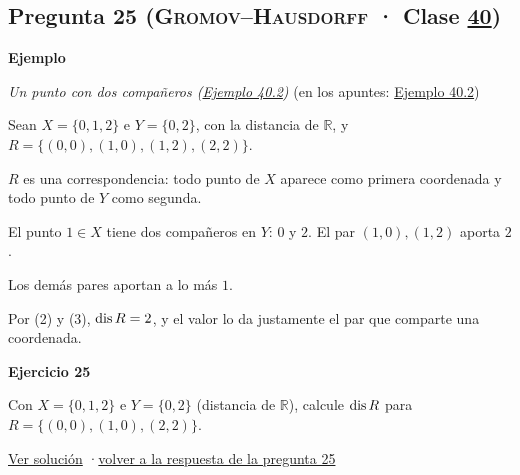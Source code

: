 \documentclass[11pt,a4paper]{article}
\newcommand{\R}{\mathbb{R}}\newcommand{\N}{\mathbb{N}}\newcommand{\Q}{\mathbb{Q}}
\newcommand{\bloque}[1]{\par\smallskip\noindent\textbf{\color{acento}#1}\par}
\begin{document}
\subsection*{\hypertarget{e-25}{}Pregunta 25 \normalfont\small(\textsc{Gromov–Hausdorff} · Clase \href{https://decostruttivismo.github.io/MAT2514-repaso/pdf/MAT2514_apuntes_completos.pdf\#nameddest=section.40}{40})}
\bloque{Ejemplo}
\textit{Un punto con dos compañeros (\href{https://decostruttivismo.github.io/MAT2514-repaso/pdf/MAT2514_apuntes_completos.pdf\#nameddest=teorema.40.2}{Ejemplo 40.2})} {\small(en los apuntes: \href{https://decostruttivismo.github.io/MAT2514-repaso/pdf/MAT2514_apuntes_completos.pdf\#nameddest=teorema.40.2}{Ejemplo 40.2})}
\begin{pasos}
\item[] Sean $X=\{0,1,2\}$ e $Y=\{0,2\}$, con la distancia de $\R$, y $R=\{(0,0),(1,0),(1,2),(2,2)\}$.
\item[(1)] $R$ es una correspondencia: todo punto de $X$ aparece como primera coordenada y todo punto de $Y$ como segunda.
\item[(2)] El punto $1\in X$ tiene dos compañeros en $Y$: $0$ y $2$. El par $(1,0),(1,2)$ aporta $2$.
\item[(3)] Los demás pares aportan a lo más $1$.
\item[] Por (2) y (3), $\operatorname{dis} R=2$, y el valor lo da justamente el par que comparte una coordenada.
\end{pasos}
\bloque{\hypertarget{x-25}{}Ejercicio 25}
Con $X=\{0,1,2\}$ e $Y=\{0,2\}$ (distancia de $\R$), calcule $\operatorname{dis} R$ para $R=\{(0,0),(1,0),(2,2)\}$.
\par{\small \hyperlink{s-25}{Ver solución} \quad·\quad \hyperlink{r-25}{volver a la respuesta de la pregunta 25}}
\end{document}
